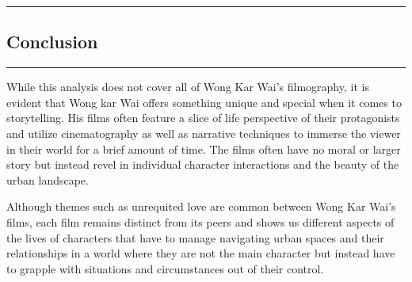 {\color{gray}\hrule}
\begin{center}
\section{Conclusion}
\end{center}
{\color{gray}\hrule}
\vspace{0.5cm}
While this analysis does not cover all of Wong Kar Wai's filmography, it is evident that Wong kar Wai offers something unique and special when it comes to storytelling. His films often feature a slice of life perspective of their protagonists and utilize cinematography as well as narrative techniques to immerse the viewer in their world for a brief amount of time. The films often have no moral or larger story but instead revel in individual character interactions and the beauty of the urban landscape.

Although themes such as unrequited love are common between Wong Kar Wai's films, each film remains distinct from its peers and shows us different aspects of the lives of characters that have to manage navigating urban spaces and their relationships in a world where they are not the main character but instead have to grapple with situations and circumstances out of their control.